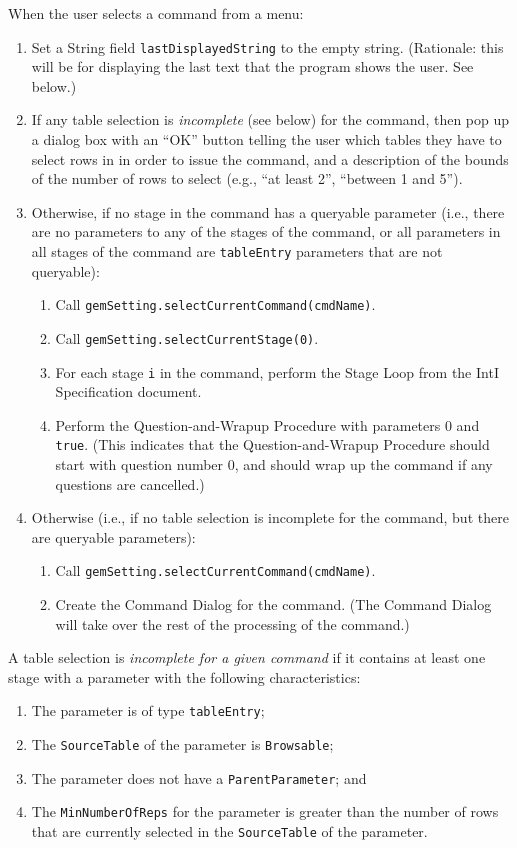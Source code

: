 \documentclass[11pt]{article}
\begin{document}
When the user selects a command from a menu:
\begin{enumerate}
\item Set a String field {\tt lastDisplayedString} to the empty string.
  (Rationale:  this will be for displaying the last text that the program
  shows the user.  See below.)
\item If any table selection is {\it incomplete} (see below) for the command,
  then pop up a dialog box with an ``OK'' button telling the user
  which tables they have to select rows in in order to issue the
  command, and a description of the bounds of the number of rows to
  select (e.g., ``at least 2'', ``between 1 and 5'').
\item Otherwise, if no stage in the command has a queryable parameter
  (i.e., there are no parameters to any of the stages of the command, or all
  parameters in all stages of the command are
  {\tt tableEntry} parameters that are not queryable):
  \begin{enumerate}
  \item Call {\tt gemSetting.selectCurrentCommand(cmdName)}.
  \item Call {\tt gemSetting.selectCurrentStage(0)}.
  \item For each stage \verb/i/ in the command, perform the Stage Loop
    from the IntI Specification document.
  \item Perform the Question-and-Wrapup Procedure with parameters 0 and
    {\tt true}.  (This indicates that the Question-and-Wrapup
    Procedure should start with question number 0, and should wrap up
    the command if any questions are cancelled.)
  \end{enumerate}
\item Otherwise (i.e., if no table selection is incomplete for
  the command, but there are queryable parameters):
  \begin{enumerate}
  \item Call {\tt gemSetting.selectCurrentCommand(cmdName)}.
  \item Create the Command Dialog for the command.
    (The Command Dialog will take over the rest of the processing
    of the command.)
  \end{enumerate}
\end{enumerate}
A table selection is {\it incomplete for a given command}
if it contains at least one stage with a parameter with the following
characteristics:
\begin{enumerate}
\item The parameter is of type {\tt tableEntry};
\item The {\tt SourceTable} of the parameter is {\tt Browsable};
\item The parameter does not have a {\tt ParentParameter}; and
\item The {\tt MinNumberOfReps} for the parameter is greater than the
  number of rows that are currently selected in the {\tt SourceTable} of the
  parameter.
\end{enumerate}
\end{document}
